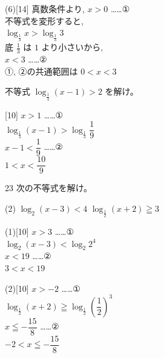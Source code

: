 \documentclass[14pt,dvipdfmx]{jsarticle}
\begin{document}
\begin{minipage}[t]{0.48\textwidth}
\begin{answerbox}{(6)}[14]
  {\footnotesize
  真数条件より, $x>0$ ……①\\
  不等式を変形すると,\\
  $\log_{\frac{1}{3}} x > \log_{\frac{1}{3}} 3$\\
  底 $\frac{1}{3}$ は $1$ より小さいから,\\
  $x<3$ ……②\\
  ①, ②の共通範囲は $0<x<3$}
\end{answerbox}
\end{minipage}

\vfill
\nextpage

\quad
不等式 $\log_{\frac{1}{3}}(x-1)>2$ を解け。
\vspace{0.06em}

\begin{answerbox}{}[10]
  $x>1$ \quad ……①\\
  $\log_{\frac{1}{3}}(x-1) > \log_{\frac{1}{3}}\dfrac{1}{9}$ \\
  $x-1 < \dfrac{1}{9}$ \quad ……②\\
   $1<x<\dfrac{10}{9}$
\end{answerbox}

\begin{practiceprob}{23}
  次の不等式を解け。
  \begin{tasks}[label=(\arabic*), label-width=1.6zw, item-indent=2zw, after-item-skip=0.04em](2)
    \task $\log_{2}(x-3)<4$
    \task $\log_{\frac{1}{2}}(x+2) \geqq 3$
  \end{tasks}
\end{practiceprob}
\begin{answerbox}{(1)}[10]
  $x>3$ \quad ……①\\
  $\log_{2}(x-3) < \log_{2} 2^{4}$ \\
  $x<19$ \quad ……②\\
   $3<x<19$
\end{answerbox}
\vspace{0.08em}
\begin{answerbox}{(2)}[10]
  $x>-2$ \quad ……①\\
  $\log_{\frac{1}{2}}(x+2) \geqq \log_{\frac{1}{2}}\left(\dfrac{1}{2}\right)^{3}$ \\
  $x\leqq -\dfrac{15}{8}$ \quad ……②\\
   $-2<x\leqq -\dfrac{15}{8}$
\end{answerbox}
\end{document}
